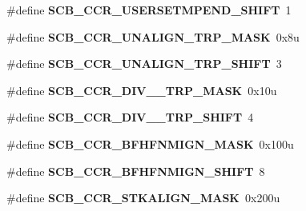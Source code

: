 \begin{DoxyCompactItemize}
\item 
\hypertarget{group___s_c_b___register___masks_gaa75b125af358d1bd905a8eaab48f7c95}{}\#define {\bfseries S\+C\+B\+\_\+\+C\+C\+R\+\_\+\+U\+S\+E\+R\+S\+E\+T\+M\+P\+E\+N\+D\+\_\+\+S\+H\+I\+F\+T}~1\label{group___s_c_b___register___masks_gaa75b125af358d1bd905a8eaab48f7c95}

\item 
\hypertarget{group___s_c_b___register___masks_ga9d58c7dfa1dbab9f9bfa87a46504b9c2}{}\#define {\bfseries S\+C\+B\+\_\+\+C\+C\+R\+\_\+\+U\+N\+A\+L\+I\+G\+N\+\_\+\+T\+R\+P\+\_\+\+M\+A\+S\+K}~0x8u\label{group___s_c_b___register___masks_ga9d58c7dfa1dbab9f9bfa87a46504b9c2}

\item 
\hypertarget{group___s_c_b___register___masks_ga41a70c541532f6ad88b841c7da86c0f6}{}\#define {\bfseries S\+C\+B\+\_\+\+C\+C\+R\+\_\+\+U\+N\+A\+L\+I\+G\+N\+\_\+\+T\+R\+P\+\_\+\+S\+H\+I\+F\+T}~3\label{group___s_c_b___register___masks_ga41a70c541532f6ad88b841c7da86c0f6}

\item 
\hypertarget{group___s_c_b___register___masks_gaf5373e6df67ed3098ed67613b87b85f8}{}\#define {\bfseries S\+C\+B\+\_\+\+C\+C\+R\+\_\+\+D\+I\+V\+\_\+\_\+\+T\+R\+P\+\_\+\+M\+A\+S\+K}~0x10u\label{group___s_c_b___register___masks_gaf5373e6df67ed3098ed67613b87b85f8}

\item 
\hypertarget{group___s_c_b___register___masks_ga08ccfcca259b77c1808188dedd3b8f6e}{}\#define {\bfseries S\+C\+B\+\_\+\+C\+C\+R\+\_\+\+D\+I\+V\+\_\+\_\+\+T\+R\+P\+\_\+\+S\+H\+I\+F\+T}~4\label{group___s_c_b___register___masks_ga08ccfcca259b77c1808188dedd3b8f6e}

\item 
\hypertarget{group___s_c_b___register___masks_ga47ea50e80f73d160c6dc7aee47c137cf}{}\#define {\bfseries S\+C\+B\+\_\+\+C\+C\+R\+\_\+\+B\+F\+H\+F\+N\+M\+I\+G\+N\+\_\+\+M\+A\+S\+K}~0x100u\label{group___s_c_b___register___masks_ga47ea50e80f73d160c6dc7aee47c137cf}

\item 
\hypertarget{group___s_c_b___register___masks_gaa3f2b0885b47aa40cd1a0a2d33961f46}{}\#define {\bfseries S\+C\+B\+\_\+\+C\+C\+R\+\_\+\+B\+F\+H\+F\+N\+M\+I\+G\+N\+\_\+\+S\+H\+I\+F\+T}~8\label{group___s_c_b___register___masks_gaa3f2b0885b47aa40cd1a0a2d33961f46}

\item 
\hypertarget{group___s_c_b___register___masks_ga41747ff80ad3657bcfa98a306feeee9d}{}\#define {\bfseries S\+C\+B\+\_\+\+C\+C\+R\+\_\+\+S\+T\+K\+A\+L\+I\+G\+N\+\_\+\+M\+A\+S\+K}~0x200u\label{group___s_c_b___register___masks_ga41747ff80ad3657bcfa98a306feeee9d}


\end{DoxyCompactItemize}

